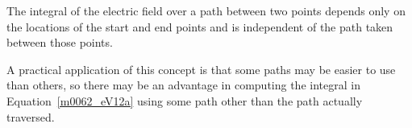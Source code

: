 \begin{mdframed}[backgroundcolor=yellow!20,nobreak=true] 
The integral of the electric field over a path between two points depends only on the locations of the start and end points and is independent of the path taken between those points.
\end{mdframed}

A practical application of this concept is that some paths may be easier to use than others, so there may be an advantage in computing the integral in Equation~\ref{m0062_eV12a} using some path other than the path actually traversed.

